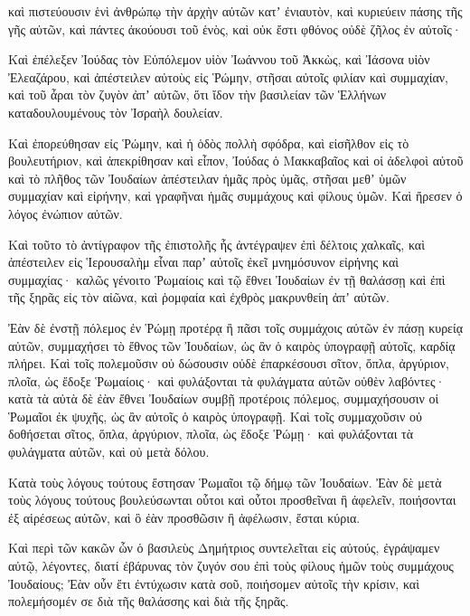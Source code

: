 {καὶ πιστεύουσιν ἑνὶ ἀνθρώπῳ τὴν ἀρχὴν αὐτῶν κατʼ ἐνιαυτὸν, καὶ κυριεύειν πάσης τῆς γῆς αὐτῶν, καὶ πάντες ἀκούουσι τοῦ ἑνὸς, καὶ οὐκ ἔστι φθόνος οὐδὲ ζῆλος ἐν αὐτοῖς·
\par }{\PP {}Καὶ ἐπέλεξεν Ἰούδας τὸν Εὐπόλεμον υἱὸν Ἰωάννου τοῦ Ἀκκὼς, καὶ Ἰάσονα υἱὸν Ἐλεαζάρου, καὶ ἀπέστειλεν αὐτοὺς εἰς Ῥώμην, στῆσαι αὐτοῖς φιλίαν καὶ συμμαχίαν,
καὶ τοῦ ἆραι τὸν ζυγὸν ἀπʼ αὐτῶν, ὅτι ἴδον τὴν βασιλείαν τῶν Ἑλλήνων καταδουλουμένους τὸν Ἰσραὴλ δουλείαν.
\par }{\PP {}Καὶ ἐπορεύθησαν εἰς Ῥώμην, καὶ ἡ ὁδὸς πολλὴ σφόδρα, καὶ εἰσῆλθον εἰς τὸ βουλευτήριον, καὶ ἀπεκρίθησαν καὶ εἶπον,
Ἰούδας ὁ Μακκαβαῖος καὶ οἱ ἀδελφοὶ αὐτοῦ καὶ τὸ πλῆθος τῶν Ἰουδαίων ἀπέστειλαν ἡμᾶς πρὸς ὑμᾶς, στῆσαι μεθʼ ὑμῶν συμμαχίαν καὶ εἰρήνην, καὶ γραφῆναι ἡμᾶς συμμάχους καὶ φίλους ὑμῶν.
Καὶ ἤρεσεν ὁ λόγος ἐνώπιον αὐτῶν.
\par }{\PP {}Καὶ τοῦτο τὸ ἀντίγραφον τῆς ἐπιστολῆς ἧς ἀντέγραψεν ἐπὶ δέλτοις χαλκαῖς, καὶ ἀπέστειλεν εἰς Ἱερουσαλὴμ εἶναι παρʼ αὐτοῖς ἐκεῖ μνημόσυνον εἰρήνης καὶ συμμαχίας·
καλῶς γένοιτο Ῥωμαίοις καὶ τῷ ἔθνει Ἰουδαίων ἐν τῇ θαλάσσῃ καὶ ἐπὶ τῆς ξηρᾶς εἰς τὸν αἰῶνα, καὶ ῥομφαία καὶ ἐχθρὸς μακρυνθείη ἀπʼ αὐτῶν.
\par }{\PP {}Ἐὰν δὲ ἐνστῇ πόλεμος ἐν Ῥώμῃ προτέρᾳ ἢ πᾶσι τοῖς συμμάχοις αὐτῶν ἐν πάσῃ κυρείᾳ αὐτῶν,
συμμαχήσει τὸ ἔθνος τῶν Ἰουδαίων, ὡς ἂν ὁ καιρὸς ὑπογραφῇ αὐτοῖς, καρδίᾳ πλήρει.
Καὶ τοῖς πολεμοῦσιν οὐ δώσουσιν οὐδὲ ἐπαρκέσουσι σῖτον, ὅπλα, ἀργύριον, πλοῖα, ὡς ἔδοξε Ῥωμαίοις· καὶ φυλάξονται τὰ φυλάγματα αὐτῶν οὐθὲν λαβόντες·
κατὰ τὰ αὐτὰ δὲ ἐὰν ἔθνει Ἰουδαίων συμβῇ προτέροις πόλεμος, συμμαχήσουσιν οἱ Ῥωμαῖοι ἐκ ψυχῆς, ὡς ἂν αὐτοῖς ὁ καιρὸς ὑπογραφῇ.
Καὶ τοῖς συμμαχοῦσιν οὐ δοθήσεται σῖτος, ὅπλα, ἀργύριον, πλοῖα, ὡς ἔδοξε Ῥώμῃ· καὶ φυλάξονται τὰ φυλάγματα αὐτῶν, καὶ οὐ μετὰ δόλου.
\par }{\PP {}Κατὰ τοὺς λόγους τούτους ἔστησαν Ῥωμαῖοι τῷ δήμῳ τῶν Ἰουδαίων.
Ἐὰν δὲ μετὰ τοὺς λόγους τούτους βουλεύσωνται οὗτοι καὶ οὗτοι προσθεῖναι ἢ ἀφελεῖν, ποιήσονται ἐξ αἱρέσεως αὐτῶν, καὶ ὃ ἐὰν προσθῶσιν ἢ ἀφέλωσιν, ἔσται κύρια.
\par }{\PP {}Καὶ περὶ τῶν κακῶν ὧν ὁ βασιλεὺς Δημήτριος συντελεῖται εἰς αὐτούς, ἐγράψαμεν αὐτῷ, λέγοντες, διατί ἐβάρυνας τὸν ζυγόν σου ἐπὶ τοὺς φίλους ἡμῶν τοὺς συμμάχους Ἰουδαίους;
Ἐὰν οὖν ἔτι ἐντύχωσιν κατὰ σοῦ, ποιήσομεν αὐτοῖς τὴν κρίσιν, καὶ πολεμήσομέν σε διὰ τῆς θαλάσσης καὶ διὰ τῆς ξηρᾶς.

}
